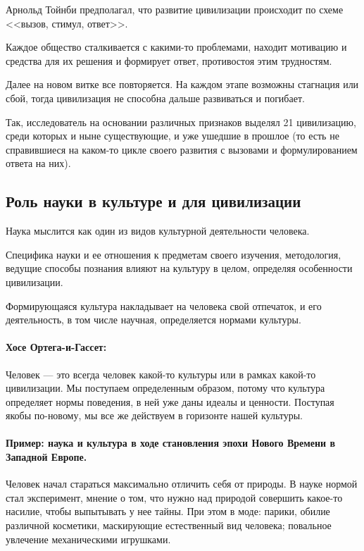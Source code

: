 \begin{itemize}
Арнольд Тойнби предполагал, что развитие цивилизации происходит по схеме
<<вызов, стимул, ответ>>. 

Каждое общество сталкивается с какими-то проблемами,
находит мотивацию и средства для их решения и формирует ответ,
противостоя этим трудностям. 

Далее на новом витке все повторяется. На каждом
этапе возможны стагнация или сбой, тогда цивилизация не способна дальше
развиваться и погибает. 

Так, исследователь на основании различных признаков
выделял 21 цивилизацию, среди которых и ныне существующие, и уже ушедшие в
прошлое (то есть не справившиеся на каком-то цикле своего развития с вызовами и
формулированием ответа на них). 
\end{itemize}


\subsection{Роль науки в культуре и для цивилизации}

Наука мыслится как один из видов культурной деятельности человека. 

Специфика науки и ее отношения к предметам своего изучения,
методология, ведущие способы познания влияют на культуру в целом, определяя
особенности цивилизации.

Формирующаяся культура накладывает на человека свой отпечаток, и его деятельность, в том числе научная, определяется нормами культуры.

\paragraph{Хосе Ортега-и-Гассет:} Человек — это всегда человек какой-то культуры или в рамках какой-то цивилизации. Мы поступаем определенным образом, потому что культура определяет нормы поведения, в ней уже даны идеалы и ценности. Поступая якобы по-новому, мы все же
действуем в горизонте нашей культуры.


\paragraph{Пример: наука и культура в ходе становления эпохи Нового Времени в Западной Европе.} 

Человек начал стараться максимально отличить себя от природы. 
В науке нормой стал эксперимент, мнение о том, что нужно над природой совершить какое-то насилие, чтобы  выпытывать у нее тайны. При этом в моде: парики, обилие различной косметики, маскирующие естественный вид человека; повальное увлечение механическими игрушками.

